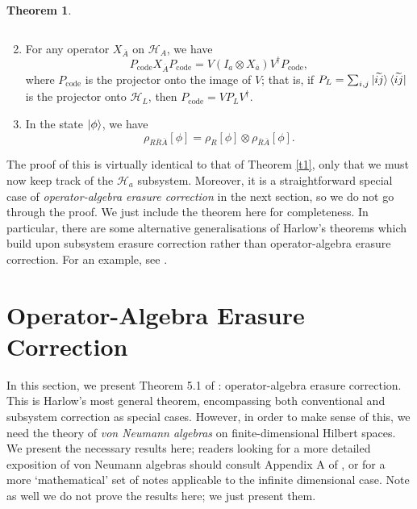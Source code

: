 \documentclass[12pt,a4paper]{report}
\numberwithin{equation}{section}
\newcommand{\ketbra}[2]{\ket{#1}\bra{#2}}
\newcommand{\ketbras}[1]{\ketbra{#1}{#1}}
\newcommand{\Pc}{P_{\text{code}}}
\newcommand{\ol}[1]{\overline{#1}}
\theoremstyle{definition}
\theoremstyle{theorem}
\newtheorem{theorem}{Theorem}[section]
\theoremstyle{theorem}
\theoremstyle{example}
\theoremstyle{definition}
\begin{document}
\begin{theorem}
\begin{enumerate}
\begin{equation}
		\end{equation}
		\item For any operator $X_{\ol{A}}$ on $\mathcal{H}_{A}$, we have
		\begin{equation}\label{S3}
			\Pc X_{\ol{A}}\Pc=V(I_{a}\otimes X_{\ol{a}})V^{\dagger}\Pc,
		\end{equation}
		where $\Pc$ is the projector onto the image of $V$; that is, if $P_{L}=\sum_{i,j}\ketbras{\widetilde{ij}}$ is the projector onto $\mathcal{H}_{L}$, then $\Pc=VP_{L}V^{\dagger}$.
		\item In the state $\ket{\phi}$, we have
		\begin{equation}\label{S4}
			\rho_{R\ol{R}\ol{A}}[\phi]=\rho_{R}[\phi]\otimes\rho_{\ol{R}\ol{A}}[\phi].
		\end{equation}
	\end{enumerate}
\end{theorem}
The proof of this is virtually identical to that of Theorem \ref{t1}, only that we must now keep track of the $\mathcal{H}_{a}$ subsystem. Moreover, it is a straightforward special case of \textit{operator-algebra erasure correction} in the next section, so we do not go through the proof. We just include the theorem here for completeness. In particular, there are some alternative generalisations of Harlow's theorems which build upon subsystem erasure correction rather than operator-algebra erasure correction. For an example, see \cite{QMS}.

\section{Operator-Algebra Erasure Correction}
In this section, we present Theorem 5.1 of \cite{Harlow}: operator-algebra erasure correction. This is Harlow's most general theorem, encompassing both conventional and subsystem correction as special cases. However, in order to make sense of this, we need the theory of \textit{von Neumann algebras} on finite-dimensional Hilbert spaces. We present the necessary results here; readers looking for a more detailed exposition of von Neumann algebras should consult Appendix A of \cite{Harlow}, or \cite{VNA} for a more `mathematical' set of notes applicable to the infinite dimensional case. Note as well we do not prove the results here; we just present them.
\end{document}
